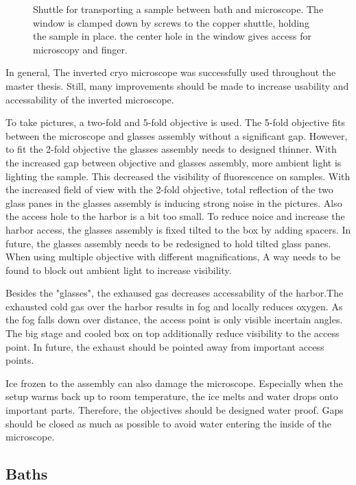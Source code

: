 \begin{figure}[hbt!]
	\centering
	
	\caption{Shuttle for transporting a sample between bath and microscope. The window is clamped down by screws to the copper shuttle, holding the sample in place. the center hole in the window gives access for microscopy and finger.}
	\label{fig:shuttle}
\end{figure}

In general, The inverted cryo microscope was successfully used throughout the master thesis. Still, many improvements should be made to increase usability and accessability of the inverted microscope. 

To take pictures, a two-fold and 5-fold objective is used. The 5-fold objective fits between the microscope and glasses assembly without a significant gap. However, to fit the 2-fold objective the glasses assembly needs to designed thinner. With the increased gap between objective and glasses assembly, more ambient light is lighting the sample. This decreased the visibility of fluorescence on samples. With the increased field of view with the 2-fold objective, total reflection of the two glass panes in the glasses assembly is inducing strong noise in the pictures. Also the access hole to the harbor is a bit too small.
To reduce noice and increase the harbor access, the glasses assembly is fixed tilted to the box by adding spacers. In future, the glasses assembly needs to be redesigned to hold tilted glass panes. When using multiple objective with different magnifications, A way needs to be found to block out ambient light to increase visibility.

Besides the "glasses", the exhaused gas decreases accessability of the harbor.The exhausted cold gas over the harbor results in fog and locally reduces oxygen. As the fog falls down over distance, the access point is only visible incertain angles.
The big stage and cooled box on top additionally reduce visibility to the access point. In future, the exhaust should be pointed away from important access points.

Ice frozen to the assembly can also damage the microscope. Especially when the setup warms back up to room temperature, the ice melts and water drops onto important parts. Therefore, the objectives should be designed water proof. Gaps should be closed as much as possible to avoid water entering the inside of the microscope.

\subsection{Baths}

